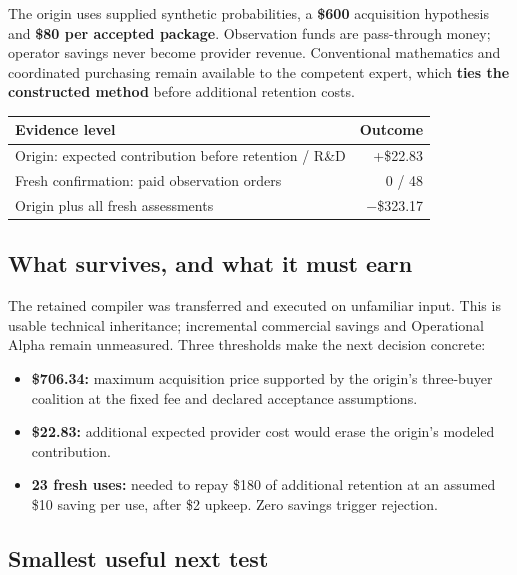 \documentclass[10pt,letterpaper]{article}
\providecommand{\tightlist}{\setlength{\itemsep}{0pt}\setlength{\parskip}{0pt}}
\begin{document}
The origin uses supplied synthetic probabilities, a \textbf{\$600}
acquisition hypothesis and \textbf{\$80 per accepted package}.
Observation funds are pass-through money; operator savings never become
provider revenue. Conventional mathematics and coordinated purchasing
remain available to the competent expert, which \textbf{ties the
constructed method} before additional retention costs.

\begin{longtable}[]{@{}lr@{}}
\toprule\noalign{}
Evidence level & Outcome \\
\midrule\noalign{}
\endhead
\bottomrule\noalign{}
\endlastfoot
Origin: expected contribution before retention / R\&D & +\$22.83 \\
Fresh confirmation: paid observation orders & 0 / 48 \\
Origin plus all fresh assessments & −\$323.17 \\
\end{longtable}

\hypertarget{what-survives-and-what-it-must-earn}{%
\subsection{What survives, and what it must
earn}\label{what-survives-and-what-it-must-earn}}

The retained compiler was transferred and executed on unfamiliar input.
This is usable technical inheritance; incremental commercial savings and
Operational Alpha remain unmeasured. Three thresholds make the next
decision concrete:

\begin{itemize}
\tightlist
\item
  \textbf{\$706.34:} maximum acquisition price supported by the origin's
  three-buyer coalition at the fixed fee and declared acceptance
  assumptions.
\item
  \textbf{\$22.83:} additional expected provider cost would erase the
  origin's modeled contribution.
\item
  \textbf{23 fresh uses:} needed to repay \$180 of additional retention
  at an assumed \$10 saving per use, after \$2 upkeep. Zero savings
  trigger rejection.
\end{itemize}

\hypertarget{smallest-useful-next-test}{%
\subsection{Smallest useful next test}\label{smallest-useful-next-test}}
\end{document}
